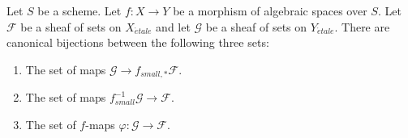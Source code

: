 \begin{lemma}
\label{lemma-f-map}
Let $S$ be a scheme.
Let $f : X \to Y$ be a morphism of algebraic spaces over $S$.
Let $\mathcal{F}$ be a sheaf of sets on $X_{\acute{e}tale}$ and
let $\mathcal{G}$ be a sheaf of sets on $Y_{\acute{e}tale}$.
There are canonical bijections between the following three sets:
\begin{enumerate}
\item The set of maps $\mathcal{G} \to f_{small, *}\mathcal{F}$.
\item The set of maps $f_{small}^{-1}\mathcal{G} \to \mathcal{F}$.
\item The set of $f$-maps $\varphi : \mathcal{G} \to \mathcal{F}$.
\end{enumerate}
\end{lemma}

